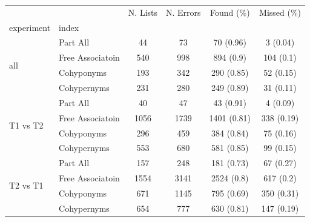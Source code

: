 \begin{tabular}{llcccc}
\toprule
 &  & N. Lists & N. Errors & Found (\%) & Missed (\%) \\
experiment & index &  &  &  &  \\
\midrule
\multirow[t]{4}{*}{all} & Part All & 44 & 73 & 70 (0.96) & 3 (0.04) \\
 & Free Associatoin & 540 & 998 & 894 (0.9) & 104 (0.1) \\
 & Cohyponyms & 193 & 342 & 290 (0.85) & 52 (0.15) \\
 & Cohypernyms & 231 & 280 & 249 (0.89) & 31 (0.11) \\
\cmidrule{1-6}
\multirow[t]{4}{*}{T1 vs T2} & Part All & 40 & 47 & 43 (0.91) & 4 (0.09) \\
 & Free Associatoin & 1056 & 1739 & 1401 (0.81) & 338 (0.19) \\
 & Cohyponyms & 296 & 459 & 384 (0.84) & 75 (0.16) \\
 & Cohypernyms & 553 & 680 & 581 (0.85) & 99 (0.15) \\
\cmidrule{1-6}
\multirow[t]{4}{*}{T2 vs T1} & Part All & 157 & 248 & 181 (0.73) & 67 (0.27) \\
 & Free Associatoin & 1554 & 3141 & 2524 (0.8) & 617 (0.2) \\
 & Cohyponyms & 671 & 1145 & 795 (0.69) & 350 (0.31) \\
 & Cohypernyms & 654 & 777 & 630 (0.81) & 147 (0.19) \\
\cmidrule{1-6}
\bottomrule
\end{tabular}
